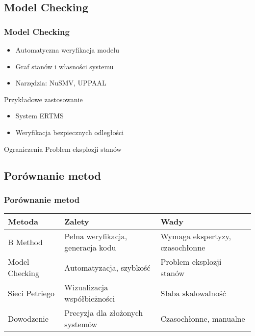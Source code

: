 \documentclass{beamer}
\begin{document}
\subsection{Model Checking}
\begin{frame}
\frametitle{Model Checking}
\begin{itemize}
\item Automatyczna weryfikacja modelu
\item Graf stanów i własności systemu
\item Narzędzia: NuSMV, UPPAAL
\end{itemize}

\begin{exampleblock}{Przykładowe zastosowanie}
\begin{itemize}
\item System ERTMS
\item Weryfikacja bezpiecznych odległości
\end{itemize}
\end{exampleblock}

\begin{alertblock}{Ograniczenia}
Problem eksplozji stanów
\end{alertblock}
\end{frame}

\subsection{Porównanie metod}
\begin{frame}
\frametitle{Porównanie metod}
\scriptsize
\begin{tabularx}{\textwidth}{|l|X|X|}
\hline
\textbf{Metoda} & \textbf{Zalety} & \textbf{Wady} \\
\hline
B Method &
Pełna weryfikacja, generacja kodu &
Wymaga ekspertyzy, czasochłonne \\
\hline
Model Checking &
Automatyzacja, szybkość &
Problem eksplozji stanów \\
\hline
Sieci Petriego &
Wizualizacja współbieżności &
Słaba skalowalność \\
\hline
Dowodzenie &
Precyzja dla złożonych systemów &
Czasochłonne, manualne \\
\hline
\end{tabularx}
\end{frame}
\end{document}
